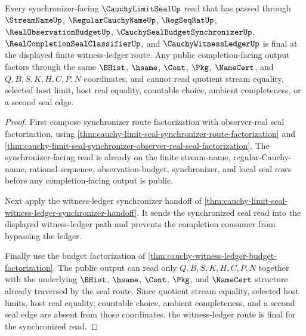 \begin{theorem}
\label{thm:cauchy-limit-seal-synchronizer-witness-ledger-finality}
Every synchronizer-facing $\CauchyLimitSealUp$ read that has passed through $\StreamNameUp$, $\RegularCauchyNameUp$, $\RegSeqRatUp$, $\RealObservationBudgetUp$, $\CauchySealBudgetSynchronizerUp$, $\RealCompletionSealClassifierUp$, and $\CauchyWitnessLedgerUp$ is final at the displayed finite witness-ledger route. Any public completion-facing output factors through the same $\BHist$, $\hsame$, $\Cont$, $\Pkg$, $\NameCert$, and $Q,B,S,K,H,C,P,N$ coordinates, and cannot read quotient stream equality, selected host limit, host real equality, countable choice, ambient completeness, or a second seal edge.
\end{theorem}
\begin{proof}
First compose synchronizer route factorization with observer-real seal factorization, using \autoref{thm:cauchy-limit-seal-synchronizer-route-factorization} and \autoref{thm:cauchy-limit-seal-synchronizer-observer-real-seal-factorization}. The synchronizer-facing read is already on the finite stream-name, regular-Cauchy-name, rational-sequence, observation-budget, synchronizer, and local seal rows before any completion-facing output is public.

Next apply the witness-ledger synchronizer handoff of \autoref{thm:cauchy-limit-seal-witness-ledger-synchronizer-handoff}. It sends the synchronized seal read into the displayed witness-ledger path and prevents the completion consumer from bypassing the ledger.

Finally use the budget factorization of \autoref{thm:cauchy-witness-ledger-budget-factorization}. The public output can read only $Q,B,S,K,H,C,P,N$ together with the underlying $\BHist$, $\hsame$, $\Cont$, $\Pkg$, and $\NameCert$ structure already traversed by the seal route. Since quotient stream equality, selected host limits, host real equality, countable choice, ambient completeness, and a second seal edge are absent from those coordinates, the witness-ledger route is final for the synchronized read.
\end{proof}

